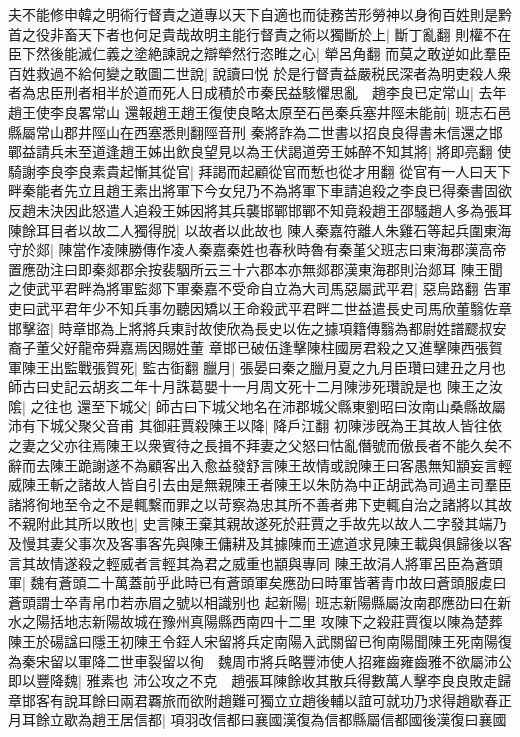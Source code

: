 夫不能修申韓之明術行督責之道專以天下自適也而徒務苦形勞神以身徇百姓則是黔首之役非畜天下者也何足貴哉故明主能行督責之術以獨斷於上|{
	斷丁亂翻}
則權不在臣下然後能滅仁義之塗絶諫說之辯犖然行恣睢之心|{
	犖呂角翻}
而莫之敢逆如此羣臣百姓救過不給何變之敢圖二世說|{
	說讀曰悦}
於是行督責益嚴税民深者為明吏殺人衆者為忠臣刑者相半於道而死人日成積於市秦民益駭懼思亂　趙李良已定常山|{
	去年趙王使李良畧常山}
還報趙王趙王復使良略太原至石邑秦兵塞井陘未能前|{
	班志石邑縣屬常山郡井陘山在西塞悉則翻陘音刑}
秦將詐為二世書以招良良得書未信還之邯鄲益請兵未至道逢趙王姊出飲良望見以為王伏謁道旁王姊醉不知其將|{
	將即亮翻}
使騎謝李良李良素貴起慚其從官|{
	拜謁而起顧從官而慙也從才用翻}
從官有一人曰天下畔秦能者先立且趙王素出將軍下今女兒乃不為將軍下車請追殺之李良已得秦書固欲反趙未決因此怒遣人追殺王姊因將其兵襲邯鄲邯鄲不知竟殺趙王邵騷趙人多為張耳陳餘耳目者以故二人獨得脱|{
	以故者以此故也}
陳人秦嘉符離人朱雞石等起兵圍東海守於郯|{
	陳當作凌陳勝傳作凌人秦嘉秦姓也春秋時魯有秦堇父班志曰東海郡漢高帝置應劭注曰即秦郯郡余按裴駰所云三十六郡本亦無郯郡漢東海郡則治郯耳}
陳王聞之使武平君畔為將軍監郯下軍秦嘉不受命自立為大司馬惡屬武平君|{
	惡烏路翻}
告軍吏曰武平君年少不知兵事勿聽因矯以王命殺武平君畔二世益遣長史司馬欣董翳佐章邯擊盜|{
	時章邯為上將將兵東討故使欣為長史以佐之據項籍傳翳為都尉姓譜飂叔安裔子董父好龍帝舜嘉焉因賜姓董}
章邯已破伍逢擊陳柱國房君殺之又進擊陳西張賀軍陳王出監戰張賀死|{
	監古衘翻}
臘月|{
	張晏曰秦之臘月夏之九月臣瓚曰建丑之月也師古曰史記云胡亥二年十月誅葛嬰十一月周文死十二月陳涉死瓚說是也}
陳王之汝隂|{
	之往也}
還至下城父|{
	師古曰下城父地名在沛郡城父縣東劉昭曰汝南山桑縣故屬沛有下城父聚父音甫}
其御莊賈殺陳王以降|{
	降戶江翻}
初陳涉旣為王其故人皆往依之妻之父亦往焉陳王以衆賓待之長揖不拜妻之父怒曰怙亂僭號而傲長者不能久矣不辭而去陳王跪謝遂不為顧客出入愈益發舒言陳王故情或說陳王曰客愚無知顓妄言輕威陳王斬之諸故人皆自引去由是無親陳王者陳王以朱防為中正胡武為司過主司羣臣諸將徇地至令之不是輒繫而罪之以苛察為忠其所不善者弗下吏輒自治之諸將以其故不親附此其所以敗也|{
	史言陳王棄其親故遂死於莊賈之手故先以故人二字發其端乃及慢其妻父事次及客事客先與陳王傭耕及其據陳而王遮道求見陳王載與俱歸後以客言其故情遂殺之輕威者言輕其為君之威重也顓與專同}
陳王故涓人將軍呂臣為蒼頭軍|{
	魏有蒼頭二十萬蓋前乎此時已有蒼頭軍矣應劭曰時軍皆著青巾故曰蒼頭服䖍曰蒼頭謂士卒青帛巾若赤眉之號以相識别也}
起新陽|{
	班志新陽縣屬汝南郡應劭曰在新水之陽括地志新陽故城在豫州真陽縣西南四十二里}
攻陳下之殺莊賈復以陳為楚葬陳王於碭諡曰隱王初陳王令銍人宋留將兵定南陽入武關留已徇南陽聞陳王死南陽復為秦宋留以軍降二世車裂留以徇　魏周市將兵略豐沛使人招雍齒雍齒雅不欲屬沛公即以豐降魏|{
	雅素也}
沛公攻之不克　趙張耳陳餘收其散兵得數萬人擊李良良敗走歸章邯客有說耳餘曰兩君覉旅而欲附趙難可獨立立趙後輔以誼可就功乃求得趙歇春正月耳餘立歇為趙王居信都|{
	項羽改信都曰襄國漢復為信都縣屬信都國後漢復曰襄國}
